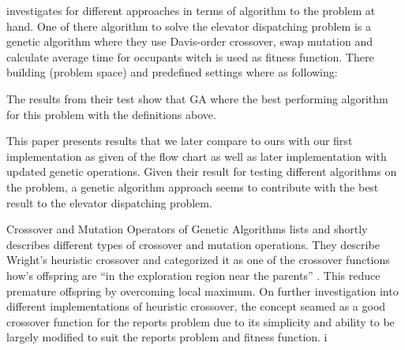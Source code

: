 \cite{ahmed2022investigation} investigates for different approaches in terms of algorithm to the problem at hand.  One of there algorithm to solve the elevator dispatching problem is a genetic algorithm where they use Davis-order crossover, swap mutation and calculate average time for occupants  witch is used as fitness function. There building (problem space) and predefined settings where as following:

The results from their test show that GA where the best performing algorithm for this problem with the definitions above.

This paper presents results that we later compare to ours with our first implementation as given of the flow chart\cite{tartan2016genetic} as well as later implementation with updated genetic operations. Given their result for testing different algorithms on the problem, a genetic algorithm approach seems to contribute with the best result to the elevator dispatching problem.

Crossover and Mutation Operators of Genetic Algorithms \cite{lim2017crossover} lists and shortly describes different types of crossover and mutation operations. They describe Wright's heuristic crossover and categorized it as one of the crossover functions how’s offspring are “in the exploration region near the parents” \cite{lim2017crossovier} . This reduce premature offspring by overcoming local maximum. On further investigation into different implementations of heuristic crossover, the concept seamed as a good crossover function for the reports problem due to its simplicity and ability to be largely modified to suit the reports problem and fitness function.
i


